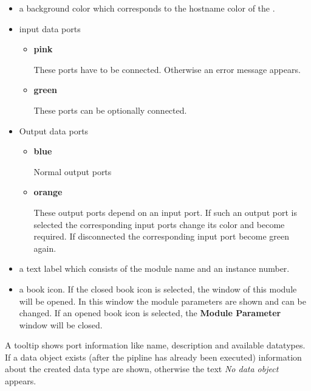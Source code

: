 	 \begin{itemize}
	 \item a background color which corresponds to the hostname color of the {\mymodulebrowser}.
    
	 \item input data ports
		 \begin{itemize}
		 \item {\bf pink}
       
       These ports have to be connected. Otherwise an error message appears.
		 \item {\bf green} 
       
       These ports can be optionally connected.
		 \end{itemize}
       
	 \item Output data ports
		 \begin{itemize}
		 \item {\bf blue}
       
       Normal output ports
		 \item {\bf orange}
       
       These output ports depend on an input port. If such an output port is selected 
		 the corresponding input ports change its color and become required. If disconnected the 
		 corresponding input port become green again.
		 \end{itemize}
       
	 
	 \item a text label which consists of the module name and an instance number.
    
	 \item a book icon. If the closed book icon is selected, the {\myparameter} window of this module will be opened. 
		 In this window the module parameters are shown and can be changed. If an opened book icon is selected, the 
		 {\bf Module Parameter} window will be closed.
	 \end{itemize}



    
    A tooltip shows port information like name, description and available datatypes.   
    If a data object exists (after the pipline has already been executed) information about the created
    data type are shown, otherwise the text {\it No data object} appears.



